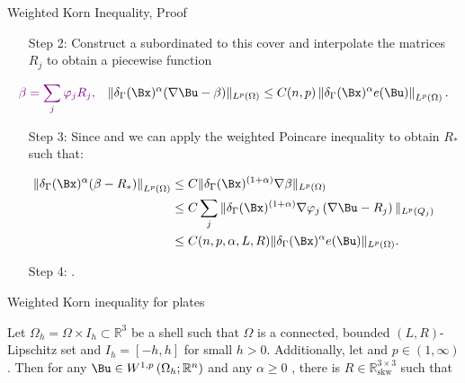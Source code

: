 \documentclass{beamer}
\begin{document}
\begin{frame}{Weighted Korn Inequality, Proof}
\begin{itemize}[leftmargin = 1.5cm]\item[Step 2:] Construct a  subordinated to this cover and interpolate the matrices $R_j$ to obtain a piecewise function 
\end{itemize}
$$\textcolor{violet}{\beta = \sum_j \varphi_j R_j,}\quad \|\delta_\GG(\Bx)^\alpha(\nabla \Bu-\beta)\|_{L^p(\Omega)}\leq  C(n,p) \left\|\delta_\GG(\Bx)^\alpha e(\Bu)\right\|_{L^p\left(\Omega\right)}.  $$
\begin{itemize}[leftmargin= 1.5cm]  
    \item[Step 3:] Since  and  we can apply the weighted Poincare inequality to obtain $R_*$ such that:
    \pause
\end{itemize}
\begin{align*}
    \left\|\delta_\GG(\Bx)^{\alpha}(\beta-R_*)\right\|_{L^p(\Omega)} &\leq C \|\delta_\GG(\Bx)^{(1+\alpha) }\nabla \beta\|_{L^p(\Omega)}\\
    & \leq C \sum_j \|\delta_\GG(\Bx)^{(1+\alpha)}\nabla \varphi_j\left(\nabla \Bu-R_j\right)\|_{L^p(Q_j)} \\
    &\leq C(n,p,\alpha,L,R)\|\delta_\GG(\Bx)^{\alpha}e(\Bu)\|_{L^p(\Omega)}.
\end{align*}
\vfill\pause
\begin{itemize}[leftmargin = 1.5cm]
    \item[Step 4:] .
\end{itemize}

\end{frame}
\begin{frame}{Weighted Korn inequality for plates}
\begin{theorem} \label{KornGammaPlate} Let $\Omega_h=\Omega\times I_h \subset \mathbb{R}^3$ be a shell such that $\Omega$ is  a connected, bounded $(L, R)$-Lipschitz set and $I_h=[-h,h]$ for small $h>0$. Additionally, let  and $p \in(1, \infty)$. Then for any $\Bu \in W^{1, p}\left(\Omega_h ; \mathbb{R}^n\right)$ and any $\alpha\geq 0 $ , there  is $R \in \mathbb{R}_{\mathrm{skw}}^{3 \times 3}$ such that
\end{theorem}
\end{frame}
\end{document}
